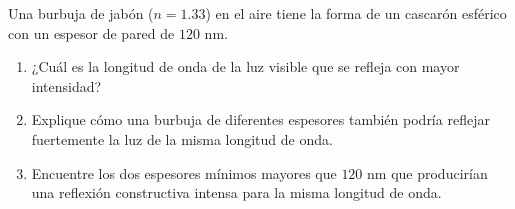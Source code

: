 \item Una burbuja de jabón ($n = 1.33$) en el aire tiene la forma de un cascarón esférico con un espesor de pared de $120\text{ nm}$.
\begin{enumerate}
    \item ¿Cuál es la longitud de onda de la luz visible que se refleja con mayor intensidad?
    \item Explique cómo una burbuja de diferentes espesores también podría reflejar fuertemente la luz de la misma longitud de onda.
    \item Encuentre los dos espesores mínimos mayores que $120\text{ nm}$ que producirían una reflexión constructiva intensa para la misma longitud de onda.
\end{enumerate}